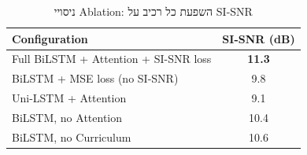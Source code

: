\begin{table}[H]
\centering
\caption{ניסויי \textenglish{Ablation}: השפעת כל רכיב על \textenglish{SI-SNR}}
\label{tab:ablation}
\begin{english}
\begin{tabular}{lc}
\toprule
\textbf{Configuration} & \textbf{SI-SNR (dB)} \\
\midrule
Full BiLSTM + Attention + SI-SNR loss   & \textbf{11.3} \\
BiLSTM + MSE loss (no SI-SNR)           & 9.8  \\
Uni-LSTM + Attention                    & 9.1  \\
BiLSTM, no Attention                    & 10.4 \\
BiLSTM, no Curriculum                  & 10.6 \\
\bottomrule
\end{tabular}
\end{english}
\end{table}
